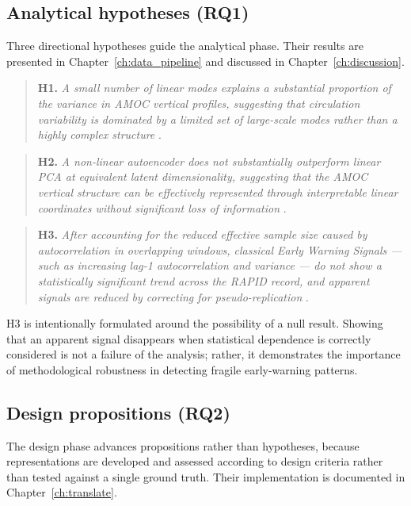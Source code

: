 \subsection*{Analytical hypotheses (RQ1)}

Three directional hypotheses guide the analytical phase. Their results are presented in Chapter~\ref{ch:data_pipeline} and discussed in Chapter~\ref{ch:discussion}.

\begin{quote}
\textbf{H1.} \emph{A small number of linear modes explains a substantial proportion of the variance in AMOC vertical profiles, suggesting that circulation variability is dominated by a limited set of large-scale modes rather than a highly complex structure} \citep{hannachi2007, buckley2016}.
\end{quote}

\begin{quote}
\textbf{H2.} \emph{A non-linear autoencoder does not substantially outperform linear PCA at equivalent latent dimensionality, suggesting that the AMOC vertical structure can be effectively represented through interpretable linear coordinates without significant loss of information} \citep{baldi1989}.
\end{quote}

\begin{quote}
\textbf{H3.} \emph{After accounting for the reduced effective sample size caused by autocorrelation in overlapping windows, classical Early Warning Signals --- such as increasing lag-1 autocorrelation and variance --- do not show a statistically significant trend across the RAPID record, and apparent signals are reduced by correcting for pseudo-replication} \citep{dakos2012, scheffer2009}.
\end{quote}

\noindent H3 is intentionally formulated around the possibility of a null result. Showing that an apparent signal disappears when statistical dependence is correctly considered is not a failure of the analysis; rather, it demonstrates the importance of methodological robustness in detecting fragile early-warning patterns.

\subsection*{Design propositions (RQ2)}

The design phase advances propositions rather than hypotheses, because representations are developed and assessed according to design criteria rather than tested against a single ground truth. Their implementation is documented in Chapter~\ref{ch:translate}.

